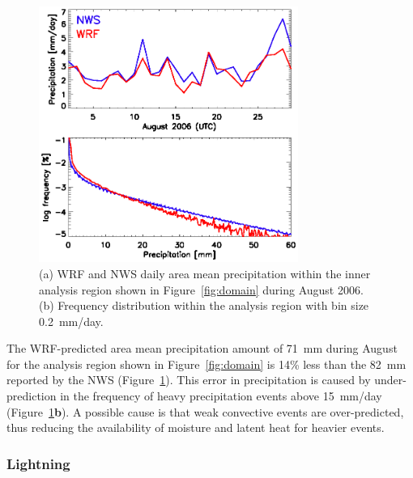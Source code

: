  \begin{figure}
 \noindent\includegraphics[width=20pc]{figures/precip_ts.eps} %
 \caption{(a) WRF and NWS daily area mean precipitation within the inner analysis region shown
in Figure~\ref{fig:domain} during August 2006. (b) Frequency distribution within the analysis region
with bin size 0.2~mm/day.}
 \label{fig:precip_ts}
 \end{figure}

The WRF-predicted area mean precipitation amount of 71~mm during August for the analysis
region shown in Figure~\ref{fig:domain} is 14\% less than the 82~mm reported by the NWS
(Figure~\ref{fig:precip_ts}). This
error in precipitation is caused by under-prediction in the frequency of heavy precipitation events above
15~mm/day (Figure~\ref{fig:precip_ts}{\bf b}). A possible cause is that weak convective events
are over-predicted, thus reducing the availability of moisture and latent heat for heavier
events.

\subsubsection{Lightning}

